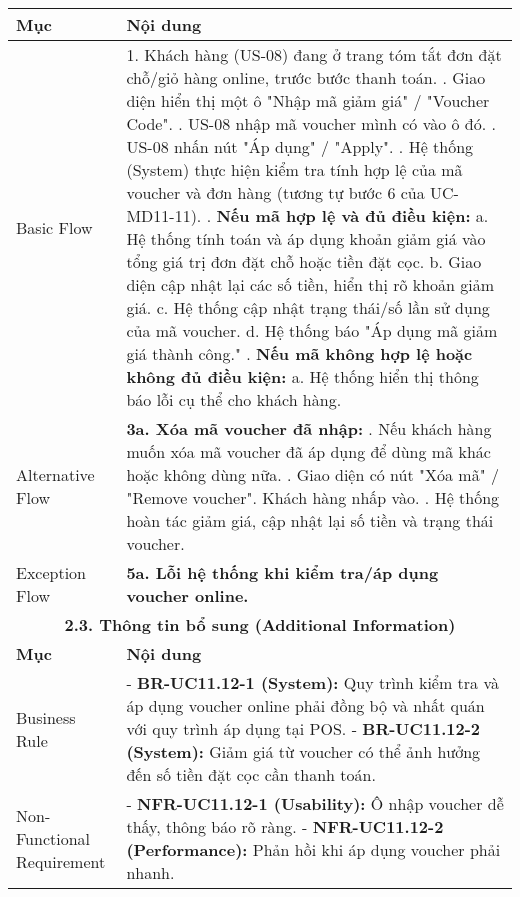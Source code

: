 \begin{longtable}{|m{4cm}|p{11cm}|}
\hline
\textbf{Mục} & \textbf{Nội dung} \\
\hline
Basic Flow & 1. Khách hàng (US-08) đang ở trang tóm tắt đơn đặt chỗ/giỏ hàng online, trước bước thanh toán. \newline 2. Giao diện hiển thị một ô "Nhập mã giảm giá" / "Voucher Code". \newline 3. US-08 nhập mã voucher mình có vào ô đó. \newline 4. US-08 nhấn nút "Áp dụng" / "Apply". \newline 5. Hệ thống (System) thực hiện kiểm tra tính hợp lệ của mã voucher và đơn hàng (tương tự bước 6 của UC-MD11-11). \newline 6. \textbf{Nếu mã hợp lệ và đủ điều kiện:} \newline    a. Hệ thống tính toán và áp dụng khoản giảm giá vào tổng giá trị đơn đặt chỗ hoặc tiền đặt cọc. \newline    b. Giao diện cập nhật lại các số tiền, hiển thị rõ khoản giảm giá. \newline    c. Hệ thống cập nhật trạng thái/số lần sử dụng của mã voucher. \newline    d. Hệ thống báo "Áp dụng mã giảm giá thành công." \newline 7. \textbf{Nếu mã không hợp lệ hoặc không đủ điều kiện:} \newline    a. Hệ thống hiển thị thông báo lỗi cụ thể cho khách hàng. \\
\hline
Alternative Flow & \textbf{3a. Xóa mã voucher đã nhập:} \newline    1. Nếu khách hàng muốn xóa mã voucher đã áp dụng để dùng mã khác hoặc không dùng nữa. \newline    2. Giao diện có nút "Xóa mã" / "Remove voucher". Khách hàng nhấp vào. \newline    3. Hệ thống hoàn tác giảm giá, cập nhật lại số tiền và trạng thái voucher. \\
\hline
Exception Flow & \textbf{5a. Lỗi hệ thống khi kiểm tra/áp dụng voucher online.} \\
\hline
\multicolumn{2}{|c|}{\textbf{2.3. Thông tin bổ sung (Additional Information)}} \\
\hline
\textbf{Mục} & \textbf{Nội dung} \\
\hline
Business Rule & - \textbf{BR-UC11.12-1 (System):} Quy trình kiểm tra và áp dụng voucher online phải đồng bộ và nhất quán với quy trình áp dụng tại POS. \newline - \textbf{BR-UC11.12-2 (System):} Giảm giá từ voucher có thể ảnh hưởng đến số tiền đặt cọc cần thanh toán. \\
\hline
Non-Functional Requirement & - \textbf{NFR-UC11.12-1 (Usability):} Ô nhập voucher dễ thấy, thông báo rõ ràng. \newline - \textbf{NFR-UC11.12-2 (Performance):} Phản hồi khi áp dụng voucher phải nhanh. \\
\hline
\end{longtable}

